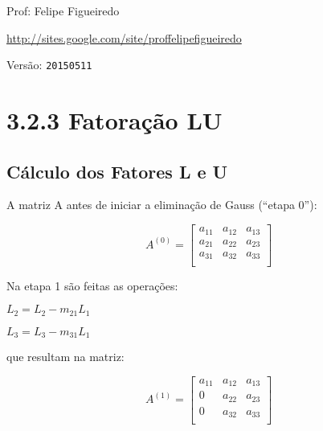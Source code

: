 \documentclass[a4paper]{article}
\begin{document}
\parbox[c]{.825\textwidth}{\raggedright%
{Prof: Felipe Figueiredo\par}
{\url{http://sites.google.com/site/proffelipefigueiredo}\par}
}

Versão: \verb|20150511|




\section*{3.2.3 Fatoração LU}

\subsection*{Cálculo dos Fatores L e U}

A matriz A antes de iniciar a eliminação de Gauss (``etapa 0''):

\begin{displaymath}
  A^{(0)} = \begin{bmatrix}
    a_{11} & a_{12} & a_{13} \\
    a_{21} & a_{22} & a_{23} \\
    a_{31} & a_{32} & a_{33} \\
  \end{bmatrix}
\end{displaymath}

Na etapa 1 são feitas as operações:

$L_2 = L_2 - m_{21}L_1$

$L_3 = L_3 - m_{31}L_1$

que resultam na matriz:

\begin{displaymath}
  A^{(1)} = \begin{bmatrix}
    a_{11} & a_{12} & a_{13} \\
    0 & a_{22} & a_{23} \\
    0 & a_{32} & a_{33} \\
  \end{bmatrix}
\end{displaymath}
\end{document}
